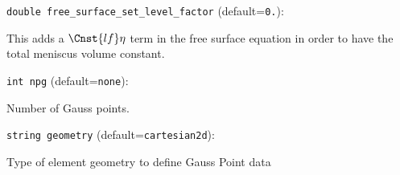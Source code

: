 \item\verb+double free_surface_set_level_factor+ {\rm(default=\verb|0.|)}:

This adds a $\Cnst{lf}\eta$ term in the free surface equation
in order to have the total meniscus volume constant. 

\item\verb+int npg+ {\rm(default=\verb|none|)}:

Number of Gauss points.

\item\verb+string geometry+ {\rm(default=\verb|cartesian2d|)}:

Type of element geometry to define Gauss Point data

